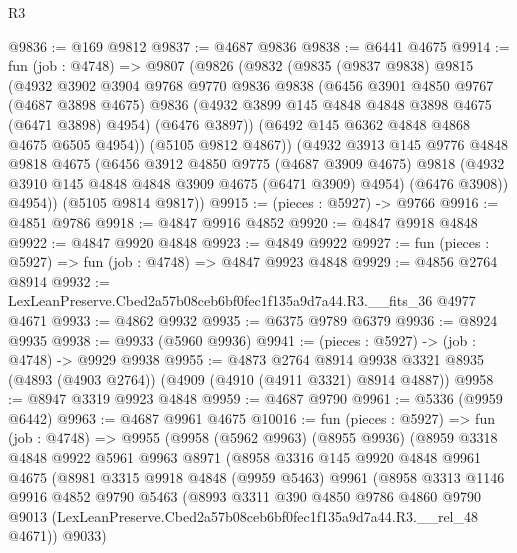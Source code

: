 \begin{lexlean}{R3}
\begin{coremodule}
@9836 := @169 @9812
@9837 := @4687 @9836
@9838 := @6441 @4675
@9914 := fun (job : @4748) =>
  @9807
    (@9826
      (@9832
        (@9835
          (@9837 @9838)
          @9815
          (@4932
            @3902
            @3904
            @9768
            @9770
            @9836
            @9838
            (@6456
              @3901
              @4850
              @9767
              (@4687 @3898 @4675)
              @9836
              (@4932 @3899 @145 @4848 @4848 @3898 @4675 (@6471 @3898) @4954)
              (@6476 @3897))
            (@6492 @145 @6362 @4848 @4868 @4675 @6505 @4954))
          (@5105 @9812 @4867))
        (@4932
          @3913
          @145
          @9776
          @4848
          @9818
          @4675
          (@6456
            @3912
            @4850
            @9775
            (@4687 @3909 @4675)
            @9818
            (@4932 @3910 @145 @4848 @4848 @3909 @4675 (@6471 @3909) @4954)
            (@6476 @3908))
          @4954))
      (@5105 @9814 @9817))
@9915 := (pieces : @5927) -> @9766
@9916 := @4851 @9786
@9918 := @4847 @9916 @4852
@9920 := @4847 @9918 @4848
@9922 := @4847 @9920 @4848
@9923 := @4849 @9922
@9927 := fun (pieces : @5927) => fun (job : @4748) => @4847 @9923 @4848
@9929 := @4856 @2764 @8914
@9932 := LexLeanPreserve.Cbed2a57b08ceb6bf0fec1f135a9d7a44.R3.__fits_36 @4977 @4671
@9933 := @4862 @9932
@9935 := @6375 @9789 @6379
@9936 := @8924 @9935
@9938 := @9933 (@5960 @9936)
@9941 := (pieces : @5927) -> (job : @4748) -> @9929 @9938
@9955 := @4873
    @2764
    @8914
    @9938
    @3321
    @8935
    (@4893 (@4903 @2764))
    (@4909 (@4910 (@4911 @3321) @8914 @4887))
@9958 := @8947 @3319 @9923 @4848
@9959 := @4687 @9790
@9961 := @5336 (@9959 @6442)
@9963 := @4687 @9961 @4675
@10016 := fun (pieces : @5927) =>
  fun (job : @4748) =>
  @9955
    (@9958
      (@5962 @9963)
      (@8955 @9936)
      (@8959
        @3318
        @4848
        @9922
        @5961
        @9963
        @8971
        (@8958
          @3316
          @145
          @9920
          @4848
          @9961
          @4675
          (@8981
            @3315
            @9918
            @4848
            (@9959 @5463)
            @9961
            (@8958
              @3313
              @1146
              @9916
              @4852
              @9790
              @5463
              (@8993
                @3311
                @390
                @4850
                @9786
                @4860
                @9790
                @9013
                (LexLeanPreserve.Cbed2a57b08ceb6bf0fec1f135a9d7a44.R3.__rel_48 @4671))
              @9033)

\end{coremodule}
\end{lexlean}
